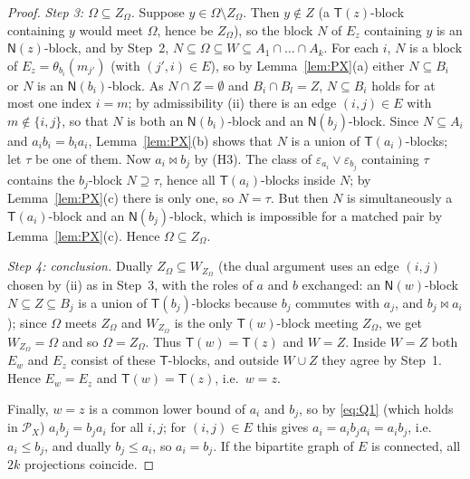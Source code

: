 \documentclass[11pt]{amsart}
\theoremstyle{definition}
\renewcommand{\P}{\mathcal{P}}
\newcommand{\T}{\mathsf{T}}
\newcommand{\N}{\mathsf{N}}
\newcommand{\mt}{\bowtie}   %
\begin{document}
\begin{proof}
\emph{Step 3: $\Omega\subseteq Z_\Omega$.} Suppose $y\in\Omega\setminus Z_\Omega$. Then $y\notin Z$ (a $\T(z)$-block containing $y$ would meet $\Omega$, hence be $Z_\Omega$), so the block $N$ of $E_z$ containing $y$ is an $\N(z)$-block, and by Step~2, $N\subseteq\Omega\subseteq W\subseteq A_1\cap\dots\cap A_k$. For each $i$, $N$ is a block of $E_z=\theta_{b_i}(m_{j'})$ (with $(j',i)\in E$), so by Lemma~\ref{lem:PX}(a) either $N\subseteq B_i$ or $N$ is an $\N(b_i)$-block. As $N\cap Z=\emptyset$ and $B_i\cap B_l=Z$, $N\subseteq B_i$ holds for at most one index $i=m$; by admissibility (ii) there is an edge $(i,j)\in E$ with $m\notin\{i,j\}$, so that $N$ is both an $\N(b_i)$-block and an $\N(b_j)$-block. Since $N\subseteq A_i$ and $a_ib_i=b_ia_i$, Lemma~\ref{lem:PX}(b) shows that $N$ is a union of $\T(a_i)$-blocks; let $\tau$ be one of them. Now $a_i\mt b_j$ by (H3). The class of $\varepsilon_{a_i}\vee\varepsilon_{b_j}$ containing $\tau$ contains the $b_j$-block $N\supseteq\tau$, hence all $\T(a_i)$-blocks inside $N$; by Lemma~\ref{lem:PX}(c) there is only one, so $N=\tau$. But then $N$ is simultaneously a $\T(a_i)$-block and an $\N(b_j)$-block, which is impossible for a matched pair by Lemma~\ref{lem:PX}(c). Hence $\Omega\subseteq Z_\Omega$.

\emph{Step 4: conclusion.} Dually $Z_\Omega\subseteq W_{Z_\Omega}$ (the dual argument uses an edge $(i,j)$ chosen by (ii) as in Step~3, with the roles of $a$ and $b$ exchanged: an $\N(w)$-block $N\subseteq Z\subseteq B_j$ is a union of $\T(b_j)$-blocks because $b_j$ commutes with $a_j$, and $b_j\mt a_i$); since $\Omega$ meets $Z_\Omega$ and $W_{Z_\Omega}$ is the only $\T(w)$-block meeting $Z_\Omega$, we get $W_{Z_\Omega}=\Omega$ and so $\Omega=Z_\Omega$. Thus $\T(w)=\T(z)$ and $W=Z$. Inside $W=Z$ both $E_w$ and $E_z$ consist of these $\T$-blocks, and outside $W\cup Z$ they agree by Step~1. Hence $E_w=E_z$ and $\T(w)=\T(z)$, i.e.\ $w=z$.

Finally, $w=z$ is a common lower bound of $a_i$ and $b_j$, so by \eqref{eq:Q1} (which holds in $\P_X$) $a_ib_j=b_ja_i$ for all $i,j$; for $(i,j)\in E$ this gives $a_i=a_ib_ja_i=a_ib_j$, i.e.\ $a_i\le b_j$, and dually $b_j\le a_i$, so $a_i=b_j$. If the bipartite graph of $E$ is connected, all $2k$ projections coincide.
\end{proof}
\end{document}
